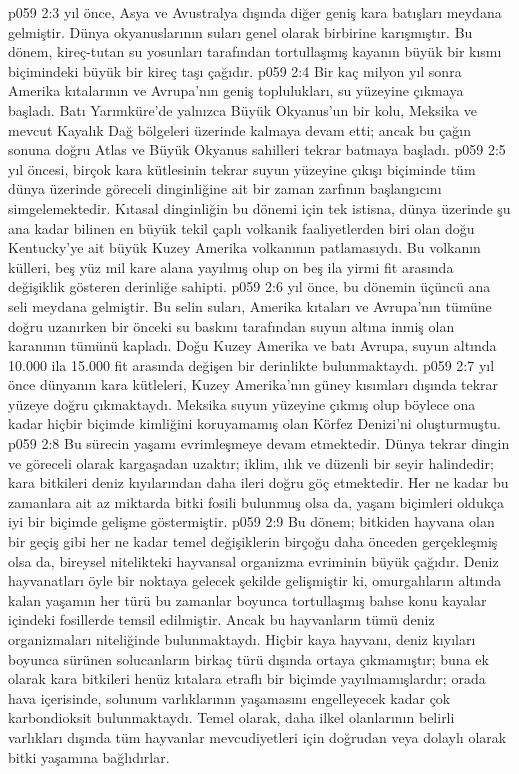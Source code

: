 \vs p059 2:3  yıl önce, Asya ve Avustralya dışında diğer geniş kara batışları meydana gelmiştir. Dünya okyanuslarının suları genel olarak birbirine karışmıştır. Bu dönem, kireç\hyp{}tutan su yosunları tarafından tortullaşmış kayanın büyük bir kısmı biçimindeki büyük bir kireç taşı çağıdır.
\vs p059 2:4 Bir kaç milyon yıl sonra Amerika kıtalarının ve Avrupa’nın geniş toplulukları, su yüzeyine çıkmaya başladı. Batı Yarımküre’de yalnızca Büyük Okyanus’un bir kolu, Meksika ve mevcut Kayalık Dağ bölgeleri üzerinde kalmaya devam etti; ancak bu çağın sonuna doğru Atlas ve Büyük Okyanus sahilleri tekrar batmaya başladı.
\vs p059 2:5  yıl öncesi, birçok kara kütlesinin tekrar suyun yüzeyine çıkışı biçiminde tüm dünya üzerinde göreceli dinginliğine ait bir zaman zarfının başlangıcını simgelemektedir. Kıtasal dinginliğin bu dönemi için tek istisna, dünya üzerinde şu ana kadar bilinen en büyük tekil çaplı volkanik faaliyetlerden biri olan doğu Kentucky’ye ait büyük Kuzey Amerika volkanının patlamasıydı. Bu volkanın külleri, beş yüz mil kare alana yayılmış olup on beş ila yirmi fit arasında değişiklik gösteren derinliğe sahipti.
\vs p059 2:6  yıl önce, bu dönemin üçüncü ana seli meydana gelmiştir. Bu selin suları, Amerika kıtaları ve Avrupa’nın tümüne doğru uzanırken bir önceki su baskını tarafından suyun altına inmiş olan karanının tümünü kapladı. Doğu Kuzey Amerika ve batı Avrupa, suyun altında 10.000 ila 15.000 fit arasında değişen bir derinlikte bulunmaktaydı.
\vs p059 2:7  yıl önce dünyanın kara kütleleri, Kuzey Amerika’nın güney kısımları dışında tekrar yüzeye doğru çıkmaktaydı. Meksika suyun yüzeyine çıkmış olup böylece ona kadar hiçbir biçimde kimliğini koruyamamış olan Körfez Denizi’ni oluşturmuştu.
\vs p059 2:8 Bu sürecin yaşamı evrimleşmeye devam etmektedir. Dünya tekrar dingin ve göreceli olarak kargaşadan uzaktır; iklim, ılık ve düzenli bir seyir halindedir; kara bitkileri deniz kıyılarından daha ileri doğru göç etmektedir. Her ne kadar bu zamanlara ait az miktarda bitki fosili bulunmuş olsa da, yaşam biçimleri oldukça iyi bir biçimde gelişme göstermiştir.
\vs p059 2:9 Bu dönem; bitkiden hayvana olan bir geçiş gibi her ne kadar temel değişiklerin birçoğu daha önceden gerçekleşmiş olsa da, bireysel nitelikteki hayvansal organizma evriminin büyük çağıdır. Deniz hayvanatları öyle bir noktaya gelecek şekilde gelişmiştir ki, omurgalıların altında kalan yaşamın her türü bu zamanlar boyunca tortullaşmış bahse konu kayalar içindeki fosillerde temsil edilmiştir. Ancak bu hayvanların tümü deniz organizmaları niteliğinde bulunmaktaydı. Hiçbir kaya hayvanı, deniz kıyıları boyunca sürünen solucanların birkaç türü dışında ortaya çıkmamıştır; buna ek olarak kara bitkileri henüz kıtalara etraflı bir biçimde yayılmamışlardır; orada hava içerisinde, solunum varlıklarının yaşamasını engelleyecek kadar çok karbondioksit bulunmaktaydı. Temel olarak, daha ilkel olanlarının belirli varlıkları dışında tüm hayvanlar mevcudiyetleri için doğrudan veya dolaylı olarak bitki yaşamına bağlıdırlar.
